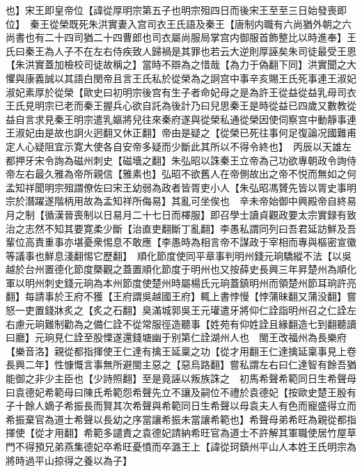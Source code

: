也】宋王即皇帝位【諱從厚明宗第五子也明宗殂四日而後宋王至至三日始發喪即位】　秦王從榮既死朱洪實妻入宫司衣王氏語及秦王【唐制内職有六尚猶外朝之六尚書也有二十四司猶二十四曹郎也司衣屬尚服局掌宫内御服首飾整比以時進奉】王氏曰秦王為人子不在左右侍疾致人歸禍是其罪也若云大逆則厚誣矣朱司徒最受王恩【朱洪實蓋加檢校司徒故稱之】當時不辯為之惜哉【為力于偽翻下同】洪實聞之大懼與康義誠以其語白閔帝且言王氏私於從榮為之詗宫中事辛亥賜王氏死事連王淑妃淑妃素厚於從榮【歐史曰初明宗後宫有生子者命妃母之是為許王從益從益乳母司衣王氏見明宗已老而秦王握兵心欲自託為後計乃曰兒思秦王是時從益已四歲又數教從益自言求見秦王明宗遣乳嫗將兒往來秦府遂與從榮私通從榮因使伺察宫中動靜事連王淑妃由是故也詗火迥翻又休正翻】帝由是疑之【從榮已死往事何足復論况國難甫定人心疑阻宜示寛大使各自安帝多疑而少斷此其所以不得令終也】　丙辰以天雄左都押牙宋令詢為磁州刺史【磁墻之翻】朱弘昭以誅秦王立帝為己功欲專朝政令詢侍帝左右最久雅為帝所親信【雅素也】弘昭不欲舊人在帝側故出之帝不悦而無如之何孟知祥聞明宗殂謂僚佐曰宋王幼弱為政者皆胥吏小人【朱弘昭馮贇先皆以胥史事明宗於潛躍遂階柄用故為孟知祥所侮易】其亂可坐俟也　辛未帝始御中興殿帝自終易月之制【循漢晉喪制以日易月二十七日而檡服】即召學士讀貞觀政要太宗實録有致治之志然不知其要寛柔少斷【治直吏翻斷丁亂翻】李愚私謂同列曰吾君延訪鮮及吾輩位高責重事亦堪憂衆惕息不敢應【李愚時為相言帝不謀政于宰相而專與樞密宣徽等議事也鮮息淺翻惕它歷翻】　順化節度使同平章事判明州錢元珦驕縱不法【以吳越於台州置德化節度槩觀之蓋置順化節度于明州也又按薛史長興三年昇楚州為順化軍以明州刺史錢元珦為本州節度使楚州時屬楊氏元珦蓋鎮明州而領楚州節耳珦許亮翻】每請事於王府不獲【王府謂吳越國王府】輒上書悖慢【悖蒲昧翻又蒲没翻】嘗怒一吏置錢牀炙之【炙之石翻】臭滿城郭吳王元瓘遣牙將仰仁詮詣明州召之仁詮左右慮元珦難制勸為之備仁詮不從常服徑造聽事【姓苑有仰姓詮且緣翻造七到翻聽讀曰廳】元珦見仁詮至股慄遂還錢塘幽于别第仁詮湖州人也　閩王改福州為長樂府【樂音洛】親從都指揮使王仁達有擒王延稟之功【從才用翻王仁達擒延稟事見上卷長興二年】性慷慨言事無所避閩主惡之【惡烏路翻】嘗私謂左右曰仁達智有餘吾猶能御之非少主臣也【少詩照翻】至是竟誣以叛族誅之　初馬希聲希範同日生希聲母曰袁德妃希範母曰陳氏希範怨希聲先立不讓及嗣位不禮於袁德妃【按歐史楚王殷有子十餘人嫡子希振長而賢其次希聲與希範同日生希聲以母袁夫人有色而寵盛得立而希振棄官為道士希聲以長幼之序當讓希振未當讓希範也】希聲母弟希旺為親從都指揮使【從才用翻】希範多譴責之袁德妃請納希旺官為道士不許解其軍職使居竹屋草門不得預兄弟燕集德妃卒希旺憂憤而卒潞王上【諱從珂鎮州平山人本姓王氏明宗為將時過平山掠得之養以為子】

